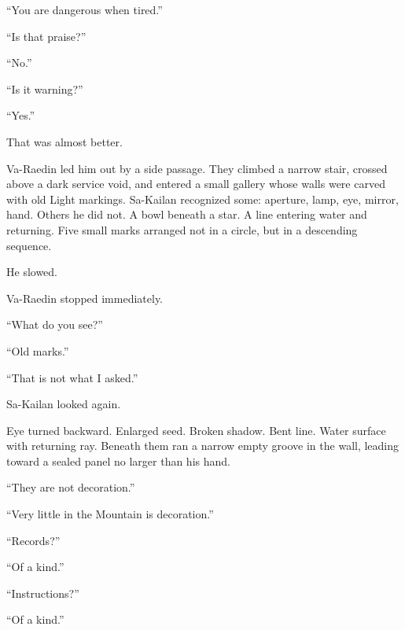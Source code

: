 “You are dangerous when tired.”\par

“Is that praise?”\par

“No.”\par

“Is it warning?”\par

“Yes.”\par

That was almost better.\par

Va-Raedin led him out by a side passage.
They climbed a narrow stair, crossed above a dark service void, and entered a small gallery whose walls were carved with old Light markings.
Sa-Kailan recognized some: aperture, lamp, eye, mirror, hand.
Others he did not.
A bowl beneath a star.
A line entering water and returning.
Five small marks arranged not in a circle, but in a descending sequence.\par

He slowed.\par

Va-Raedin stopped immediately.\par

“What do you see?”\par

“Old marks.”\par

“That is not what I asked.”\par

Sa-Kailan looked again.\par

Eye turned backward.
Enlarged seed.
Broken shadow.
Bent line.
Water surface with returning ray.
Beneath them ran a narrow empty groove in the wall, leading toward a sealed panel no larger than his hand.\par

“They are not decoration.”\par

“Very little in the Mountain is decoration.”\par

“Records?”\par

“Of a kind.”\par

“Instructions?”\par

“Of a kind.”\par

